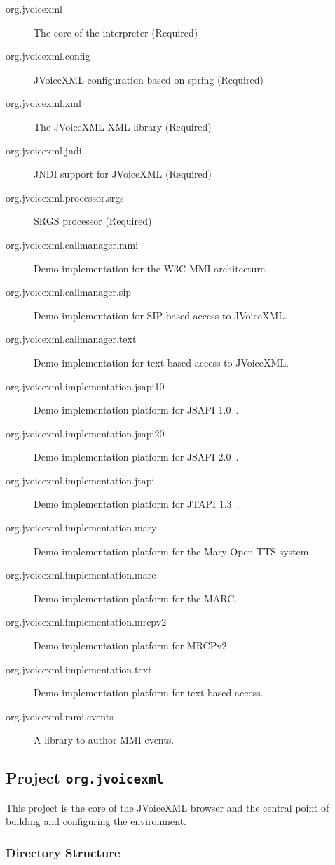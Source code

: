 \documentclass[11pt,a4paper]{article}
\begin{document}
\begin{description}
\item[org.jvoicexml] The core of the interpreter (Required)
\item[org.jvoicexml.config] JVoiceXML configuration based on spring (Required)
\item[org.jvoicexml.xml] The JVoiceXML XML library (Required)
\item[org.jvoicexml.jndi] JNDI support for JVoiceXML (Required)
\item[org.jvoicexml.processor.srgs] SRGS processor (Required)
\item[org.jvoicexml.callmanager.mmi] Demo implementation for the W3C MMI
architecture.
\item[org.jvoicexml.callmanager.sip] Demo implementation for SIP based access to
JVoiceXML.
\item[org.jvoicexml.callmanager.text] Demo implementation for text based access to
JVoiceXML.
\item[org.jvoicexml.implementation.jsapi10] Demo implementation platform for
JSAPI 1.0~\cite{sun:jsapi}.
\item[org.jvoicexml.implementation.jsapi20] Demo implementation platform for
JSAPI 2.0~\cite{jcp:jsr113}.
\item[org.jvoicexml.implementation.jtapi] Demo implementation platform for
JTAPI 1.3~\cite{sun:jtapi}.
\item[org.jvoicexml.implementation.mary] Demo implementation platform for
the Mary Open TTS system.
\item[org.jvoicexml.implementation.marc] Demo implementation platform for
the MARC.
\item[org.jvoicexml.implementation.mrcpv2] Demo implementation platform for
MRCPv2.
\item[org.jvoicexml.implementation.text] Demo implementation platform for
text based access.
\item[org.jvoicexml.mmi.events] A library to author MMI events.
\end{description}

\subsection{Project \texttt{org.jvoicexml}}

This project is the core of the JVoiceXML browser and the central point of
building and configuring the environment.

\subsubsection{Directory Structure}
\label{sec:directory-structure}
\end{document}
